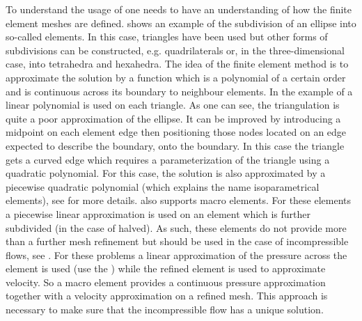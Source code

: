 To understand the usage of \finley one needs to have an understanding of how
the finite element meshes are defined.
 shows an example of the subdivision of an ellipse into
so-called elements.
In this case, triangles have been used but other forms of subdivisions can be
constructed, e.g. quadrilaterals or, in the three-dimensional case, into
tetrahedra and hexahedra. The idea of the finite element method is to
approximate the solution by a function which is a polynomial of a certain order
and is continuous across its boundary to neighbour elements.
In the example of  a linear polynomial is used on each
triangle. As one can see, the triangulation is quite a poor approximation of
the ellipse. It can be improved by introducing a midpoint on each element edge
then positioning those nodes located on an edge expected to describe the
boundary, onto the boundary.
In this case the triangle gets a curved edge which requires a parameterization
of the triangle using a quadratic polynomial.
For this case, the solution is also approximated by a piecewise quadratic
polynomial (which explains the name isoparametrical elements),
see  for more details.
\finley also supports macro elements.
For these elements a piecewise linear approximation is used on an element which
is further subdivided (in the case of \finley halved).
As such, these elements do not provide more than a further mesh refinement but
should be used in the case of incompressible flows, see .
For these problems a linear approximation of the pressure across the element is
used (use the \ReducedSolutionFS) while the refined element is used to
approximate velocity. So a macro element provides a continuous pressure
approximation together with a velocity approximation on a refined mesh.
This approach is necessary to make sure that the incompressible flow has a
unique solution.

